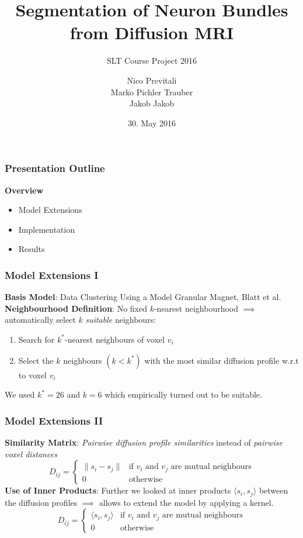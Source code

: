 \documentclass{beamer}
\title{\textbf{Segmentation of Neuron Bundles from Diffusion MRI}}
\subtitle{SLT Course Project 2016}
\author{ Nico Previtali \\ Marko Pichler Trauber \\ Jakob Jakob}
\date{30. May 2016}
\institute[ETH Zürich]
\begin{document}
\begin{frame}
 \titlepage
\end{frame}


\begin{frame}
\frametitle{Presentation Outline}
\textbf{Overview} \newline
\begin{itemize}
	\item Model Extensions
	\item Implementation
	\item Results
\end{itemize}
\end{frame}

\begin{frame}
\frametitle{Model Extensions I}
\textbf{Basis Model}: Data Clustering Using a Model Granular Magnet, Blatt et al. \cite{blatt1997data} \newline\newline
\textbf{Neighbourhood Definition}: No fixed $k$-nearest neighbourhood $\implies$ automatically select $k$ \emph{suitable} neighbours:
\linebreak
\begin{enumerate}
	\item Search for $k^*$-nearest neighbours of voxel $v_i$
	\item Select the $k$ neighbours $(k < k^*)$ with the most similar diffusion profile w.r.t to voxel $v_i$\linebreak
\end{enumerate}
We used $k^* = 26$ and $k = 6$ which empirically turned out to be suitable.
\end{frame}


\begin{frame}
\frametitle{Model Extensions II}
\textbf{Similarity Matrix}: \emph{Pairwise diffusion profile similarities} instead of \emph{pairwise voxel distances}
\begin{equation*} 
	D_{ij} = 
	\begin{cases}
		\lVert s_i - s_j \rVert & \text{if $v_i$ and $v_j$ are mutual neighbours} \\
		0 & \text{otherwise}
	\end{cases}
\end{equation*}
\textbf{Use of Inner Products}: Further we looked at inner products $\langle s_i, s_j \rangle$ between the diffusion profiles $\implies$ allows to extend the model by applying a kernel. 
\begin{equation*} 
	D_{ij} = 
	\begin{cases}
		\langle s_i, s_j \rangle & \text{if $v_i$ and $v_j$ are mutual neighbours} \\
		0 & \text{otherwise}
	\end{cases}
\end{equation*}
\end{frame}
\end{document}
